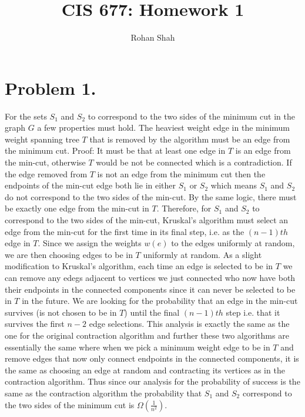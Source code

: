 \documentclass[12pt]{article}
\begin{document}
\pagestyle{plain}
\titleformat{\subsection}[runin]
  {\normalfont\large\bfseries}{\thesubsection}{1em}{}
\titleformat{\subsubsection}[runin]
  {\normalfont\large\bfseries}{\thesubsubsection}{1em}{}

\title{CIS 677: Homework 1}
\author{Rohan Shah}
\date{}

\maketitle

\section*{Problem 1.}
For the sets $S_1$ and $S_2$ to correspond to the two sides of the minimum cut
in the graph $G$ a few properties must hold. The heaviest weight edge in the
minimum weight spanning tree $T$ that is removed by the algorithm must be an
edge from the minimum cut. Proof: It must be that at least one edge in $T$ is an
edge from the min-cut, otherwise $T$ would be not be connected which is a contradiction.
If the edge removed from $T$ is not an edge from the minimum cut then the
endpoints of the min-cut edge both lie in either $S_1$ or $S_2$ which means
$S_1$ and $S_2$ do not correspond to the two sides of the min-cut. By the same
logic, there must be exactly one edge from the min-cut in $T$. Therefore, for
$S_1$ and $S_2$ to correspond to the two sides of the min-cut, Kruskal's
algorithm must select an edge from the min-cut for the first time in its final
step, i.e. as the $(n-1)th$ edge in $T$. Since we assign the weights $w(e)$ to
the edges uniformly at random, we are then choosing edges to be in $T$ uniformly
at random. As a slight modification to Kruskal's algorithm, each time an edge is
selected to be in $T$ we can remove any edegs adjacent to vertices we just
connected who now have both their endpoints in the connected components since it
can never be selected to be in $T$ in the future. We are looking for the
probability that an edge in the min-cut survives (is not chosen to be in $T$)
until the final $(n-1)th$ step i.e. that it survives the first $n-2$ edge
selections. This analysis is exactly the same as the one for the original
contraction algorithm and further these two algorithms are essentially the same
where when we pick a minimum weight edge to be in $T$ and remove edges that now
only connect endpoints in the connected components, it is the same as choosing
an edge at random and contracting its vertices as in the contraction algorithm.
Thus since our analysis for the probability of success is the same as the
contraction algorithm the probability that $S_1$ and $S_2$ correspond to the two
sides of the minimum cut is $\Omega(\frac{1}{n^2})$. 
\end{document}
